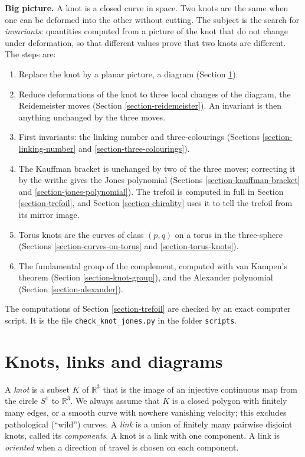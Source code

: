 \medskip\noindent
{\bf Big picture.} A knot is a closed
curve in space. Two knots are the same
when one can be deformed into the other
without cutting. The subject is the
search for {\it invariants}: quantities
computed from a picture of the knot that
do not change under deformation, so that
different values prove that two knots
are different. The steps are:
\begin{enumerate}
\item Replace the knot by a planar
picture, a diagram
(Section \ref{section-knots-diagrams}).
\item Reduce deformations of the knot to
three local changes of the diagram, the
Reidemeister moves
(Section \ref{section-reidemeister}).
An invariant is then anything unchanged
by the three moves.
\item First invariants: the linking
number and three-colourings
(Sections \ref{section-linking-number}
and \ref{section-three-colourings}).
\item The Kauffman bracket is unchanged
by two of the three moves; correcting it
by the writhe gives the Jones polynomial
(Sections \ref{section-kauffman-bracket}
and \ref{section-jones-polynomial}).
The trefoil is computed in full in
Section \ref{section-trefoil}, and
Section \ref{section-chirality} uses it
to tell the trefoil from its mirror
image.
\item Torus knots are the curves of
class $(p,q)$ on a torus in the
three-sphere
(Sections \ref{section-curves-on-torus}
and \ref{section-torus-knots}).
\item The fundamental group of the
complement, computed with van Kampen's
theorem
(Section \ref{section-knot-group}), and
the Alexander polynomial
(Section \ref{section-alexander}).
\end{enumerate}
The computations of
Section \ref{section-trefoil} are
checked by an exact computer script.
It is the file
{\tt check\_knot\_jones.py} in the
folder {\tt scripts}.

\section{Knots, links and diagrams}
\label{section-knots-diagrams}

\noindent
A {\it knot} is a subset $K$ of
$\mathbb{R}^3$ that is the image of an
injective continuous map from the circle
$S^1$ to $\mathbb{R}^3$. We always
assume that $K$ is a closed polygon with
finitely many edges, or a smooth curve
with nowhere vanishing velocity; this
excludes pathological (``wild'') curves.
A {\it link} is a union of finitely many
pairwise disjoint knots, called its
{\it components}. A knot is a link with
one component. A link is {\it oriented}
when a direction of travel is chosen on
each component.

